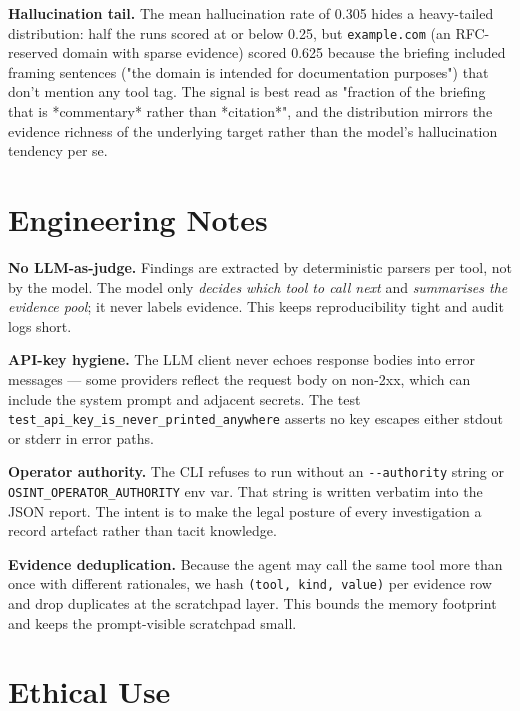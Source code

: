 \documentclass[conference]{IEEEtran}
\begin{document}
\textbf{Hallucination tail.} The mean hallucination rate of 0.305
hides a heavy-tailed distribution: half the runs scored at or below
0.25, but \texttt{example.com} (an RFC-reserved domain with sparse
evidence) scored 0.625 because the briefing included framing sentences
("the domain is intended for documentation purposes") that don't
mention any tool tag. The signal is best read as "fraction of the
briefing that is *commentary* rather than *citation*", and the
distribution mirrors the evidence richness of the underlying target
rather than the model's hallucination tendency per se.

\section{Engineering Notes}
\label{sec:engineering}

\textbf{No LLM-as-judge.} Findings are extracted by deterministic
parsers per tool, not by the model. The model only \emph{decides which
tool to call next} and \emph{summarises the evidence pool}; it never
labels evidence. This keeps reproducibility tight and audit logs short.

\textbf{API-key hygiene.} The LLM client never echoes response bodies
into error messages — some providers reflect the request body on
non-2xx, which can include the system prompt and adjacent secrets. The
test \verb|test_api_key_is_never_printed_anywhere| asserts no key
escapes either stdout or stderr in error paths.

\textbf{Operator authority.} The CLI refuses to run without an
\verb|--authority| string or \verb|OSINT_OPERATOR_AUTHORITY| env var.
That string is written verbatim into the JSON report. The intent is to
make the legal posture of every investigation a record artefact rather
than tacit knowledge.

\textbf{Evidence deduplication.} Because the agent may call the same
tool more than once with different rationales, we hash
\verb|(tool, kind, value)| per evidence row and drop duplicates at the
scratchpad layer. This bounds the memory footprint and keeps the
prompt-visible scratchpad small.

\section{Ethical Use}
\label{sec:ethics}
\end{document}
